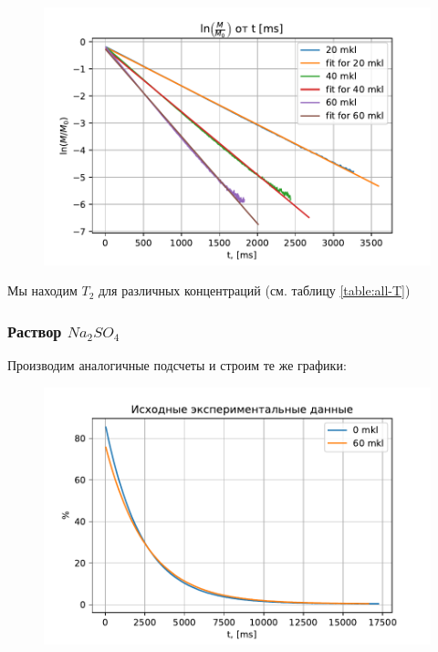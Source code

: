 \begin{figure}[!h]
	\hspace{-5em}
	\includegraphics[width=1.2\linewidth]{data/Mn_T_2_reg}
	\caption{}
	\label{fig:mnt2reg}
\end{figure}

Мы находим $ T_2 $ для различных концентраций (см. таблицу \ref{table:all-T})

\subsubsection{Раствор $Na_2 SO_4$}
Производим аналогичные подсчеты и строим те же графики:

\begin{figure}[!h]
	\hspace{-5em}
	\includegraphics[width=1.2\linewidth]{data/Na_T_2_exper}
	\caption{}
	\label{fig:nat2exper}
\end{figure}

